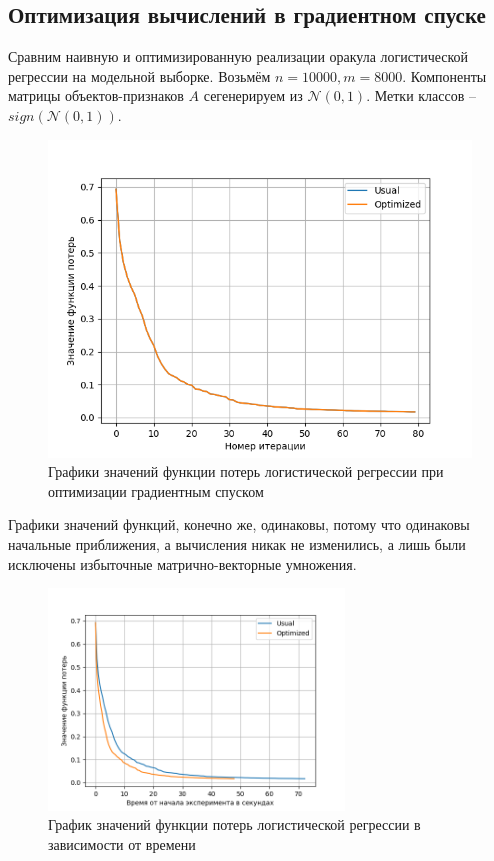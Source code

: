 \documentclass[11pt]{article}
\begin{document}
\subsection{Оптимизация вычислений в градиентном спуске}

Сравним наивную и оптимизированную реализации оракула логистической регрессии на модельной выборке.
Возьмём $n = 10000, m = 8000$. Компоненты матрицы объектов-признаков $A$ сегенерируем из $\mathcal{N}(0, 1)$. Метки классов -- $sign(\mathcal{N}(0, 1))$.


\begin{figure}[h!p]
	\centering
    \includegraphics[width=.7\textwidth]{pics/logreg_values.png}
   \captionsetup{justification=centering,margin=2cm}
   \caption{Графики значений функции потерь логистической регрессии при оптимизации градиентным спуском}
\end{figure}

Графики значений функций, конечно же, одинаковы, потому что одинаковы начальные приближения, а вычисления никак не изменились, а лишь были исключены избыточные матрично-векторные умножения.

\begin{figure}[h!p]
	\centering
    \includegraphics[width=0.7\textwidth]{pics/logreg_loss_value_vs_time.png}
\captionsetup{justification=centering}
\caption{График значений функции потерь логистической регрессии в зависимости от времени}
\label{fig:optimized_values_vs_time}
\end{figure}
\end{document}
